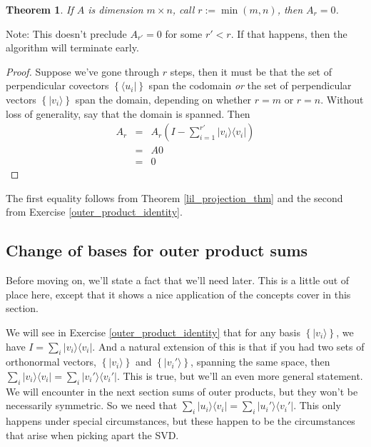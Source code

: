 \documentclass{amsbook}
\newtheorem{theorem}{Theorem}
\begin{document}
 \begin{theorem}
\label{svd_terminates}
If $A$ is dimension $m\times n$, call $r:=\min(m,n)$, then $A_r=0$.
 \end{theorem}

Note:  This doesn't preclude $A_{r'}=0$ for some $r'<r$.  If that happens, then the algorithm will terminate early.

\begin{proof}
Suppose we've gone through $r$ steps, then it must be that the set of perpendicular covectors $\left\{\langle u _i|\right\}$ span the codomain {\em or} the set of perpendicular vectors $\left\{| v _i\rangle\right\}$ span the domain, depending on whether $r=m$ or $r=n$.  Without loss of generality, say that the domain is spanned.  Then 
$$
\begin{array}{rcl}
A_r&=&A_r\left(I-\sum_{i=1}^{r'}| v _i\rangle\langle v _i|\right)\\
&=&A0\\
&=&0
\end{array}
$$
\end{proof}

The first equality follows from Theorem \ref{lil_projection_thm} and the second from Exercise \ref{outer_product_identity}.

\subsection{Change of bases for outer product sums}

Before moving on, we'll state a fact that we'll need later.  This is a little out of place here, except that it shows a nice application of the concepts cover in this section.

We will see in Exercise \ref{outer_product_identity} that for any basis $\left\{|v_i\rangle\right\}$, we have $I=\sum_i|v_i\rangle\langle v_i|$.  And a natural extension of this is that if you had two sets of orthonormal vectors, $\left\{|v_i\rangle\right\}$ and $\left\{|v_i'\rangle\right\}$, spanning the same space, then $\sum_i|v_i\rangle\langle v_i|=\sum_i|v_i'\rangle\langle v_i'|$.  This is true, but we'll an even more general statement.  We will encounter in the next section sums of outer products, but they won't be necessarily symmetric.  So we need that $\sum_i|u_i\rangle\langle v_i|=\sum_i|u_i'\rangle\langle v_i'|$.  This only happens under special circumstances, but these happen to be the circumstances that arise when picking apart the SVD.
\end{document}
